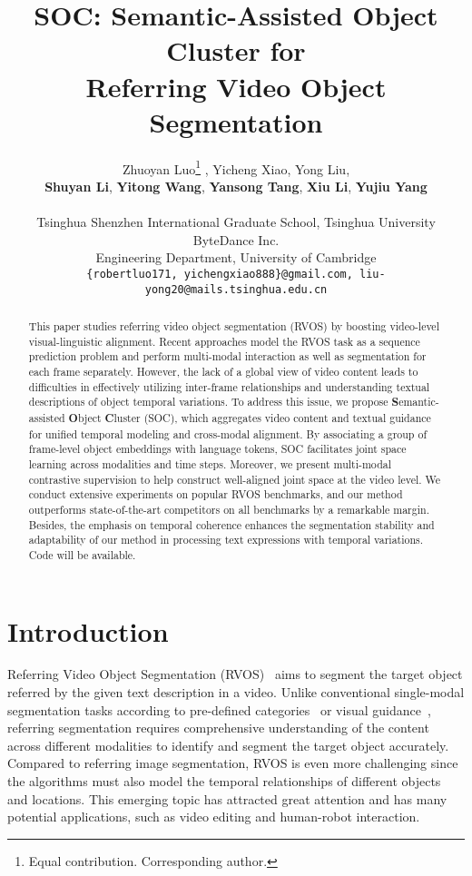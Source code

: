 \documentclass{article}
\title{SOC: Semantic-Assisted  Object Cluster for \\Referring Video Object Segmentation}
\author{Zhuoyan Luo\thanks{Equal contribution.
   Corresponding author.} , \qquad 
Yicheng Xiao, \qquad
Yong Liu, \qquad
  \\
  \textbf{Shuyan Li},
  \textbf{Yitong Wang},
  \textbf{Yansong Tang},
  \textbf{Xiu Li},
  \textbf{Yujiu Yang} \\
  \\Tsinghua Shenzhen International Graduate School, Tsinghua University
  \\ByteDance Inc.\\
  Engineering Department, University of Cambridge \\
  \texttt{\{robertluo171, yichengxiao888\}@gmail.com, liu-yong20@mails.tsinghua.edu.cn}
}
\begin{document}
\maketitle


\begin{abstract}
  This paper studies referring video object segmentation (RVOS) by boosting video-level visual-linguistic alignment. 
  Recent approaches model the RVOS task as a sequence prediction problem and perform multi-modal interaction as well as segmentation for each frame separately.  
  However, the lack of a global view of video content leads to difficulties in effectively utilizing inter-frame relationships and understanding textual descriptions of object temporal variations.
  To address this issue, we propose \textbf{S}emantic-assisted \textbf{O}bject \textbf{C}luster (SOC), which aggregates video content and textual guidance for unified temporal modeling and cross-modal alignment.
  By associating a group of frame-level object embeddings with language tokens, SOC facilitates joint space learning across modalities and time steps.
  Moreover, we present multi-modal contrastive supervision to help construct well-aligned joint space at the video level. 
  We conduct extensive experiments on popular RVOS benchmarks, and our method outperforms state-of-the-art competitors on all benchmarks by a remarkable margin. 
  Besides, the emphasis on temporal coherence enhances the segmentation stability and adaptability of our method in processing text expressions with temporal variations. Code will be available.
\end{abstract}


\section{Introduction}
Referring Video Object Segmentation (RVOS)~\cite{mttr,referformer} aims to segment the target object referred by the given text description in a video. 
Unlike conventional single-modal segmentation tasks according to pre-defined categories~\cite{vipseg, vspw} or visual guidance~\cite{vos2,vos1}, referring segmentation requires comprehensive understanding of the content across different modalities to identify and segment the target object accurately. Compared to referring image segmentation, RVOS is even more challenging since the algorithms must also model the temporal relationships of different objects and locations. This emerging topic has attracted great attention and has many potential applications, such as video editing and human-robot interaction.
\end{document}

